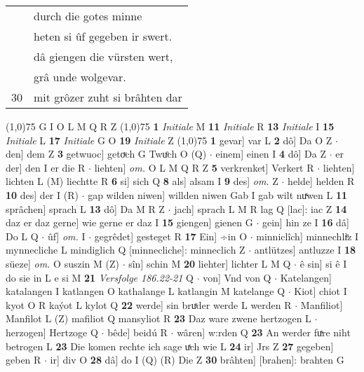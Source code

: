 \documentclass[8pt,a4paper,notitlepage]{article}
\begin{document}
\begin{table}[ht]
\begin{minipage}[t]{0.5\linewidth}
\begin{tabular}{rl}
 & durch die gotes minne\\ 
 & heten si ûf gegeben ir swert.\\ 
 & dâ giengen die vürsten wert,\\ 
 & grâ unde wolgevar.\\ 
30 & mit grôzer zuht si brâhten dar\\ 
\end{tabular}
\scriptsize
\line(1,0){75} \newline
G I O L M Q R Z \newline
\line(1,0){75} \newline
\textbf{1} \textit{Initiale} M  \textbf{11} \textit{Initiale} R  \textbf{13} \textit{Initiale} I  \textbf{15} \textit{Initiale} L  \textbf{17} \textit{Initiale} G O  \textbf{19} \textit{Initiale} Z  \newline
\line(1,0){75} \newline
\textbf{1} gevar] var L \textbf{2} dô] Da O Z  $\cdot$ den] dem Z \textbf{3} getwuoc] getoͮch G Twuͦch O (Q)  $\cdot$ einem] einen I \textbf{4} dô] Da Z  $\cdot$ er der] den I er die R  $\cdot$ liehten] \textit{om.} O L M Q R Z \textbf{5} verkrenket] Verkert R  $\cdot$ liehten] lichten L (M) liechtte R \textbf{6} si] sich Q \textbf{8} als] alsam I \textbf{9} des] \textit{om.} Z  $\cdot$ helde] helden R \textbf{10} des] der I (R)  $\cdot$ gap wilden niwen] willden niwen Gab I gab wilt nuͯwen L \textbf{11} sprâchen] sprach L \textbf{13} dô] Da M R Z  $\cdot$ jach] sprach L M R lag Q [lac]: iac Z \textbf{14} daz er daz gerne] wie gerne er daz I \textbf{15} giengen] gienen G  $\cdot$ gein] hin ze I \textbf{16} dâ] Do L Q  $\cdot$ ûf] \textit{om.} I  $\cdot$ gegrêdet] gesteget R \textbf{17} Ein] ÷in O  $\cdot$ minniclîch] minnechliͤz I mynnecliche L mindiglich Q [minnecliche]: minneclich Z  $\cdot$ antlützes] antluzze I \textbf{18} süeze] \textit{om.} O suszin M (Z)  $\cdot$ sîn] schin M \textbf{20} liehter] lichter L M Q  $\cdot$ ê sin] si ê I do sie in L e si M \textbf{21} \textit{Versfolge 186.22-21} Q   $\cdot$ von] Vnd von Q  $\cdot$ Katelangen] katalangen I katlangen O kathalange L katlangin M katelange Q  $\cdot$ Kiot] chiot I kyot O R kaýot L kylot Q \textbf{22} werde] sin bruͯder werde L werden R  $\cdot$ Manfiliot] Manfilot L (Z) mafiliot Q mansyliot R \textbf{23} Daz ware zwene hertzogen L  $\cdot$ herzogen] Hertzoge Q  $\cdot$ bêde] beidú R  $\cdot$ wâren] w:rden Q \textbf{23} An werder fuͯre niht betrogen L \textbf{23} Die komen rechte ich sage uͯch wie L \textbf{24} ir] Jrs Z \textbf{27} gegeben] geben R  $\cdot$ ir] div O \textbf{28} dâ] do I (Q) (R) Die Z \textbf{30} brâhten] [brahen]: brahten G \newline

\end{minipage}
\end{table}
\end{document}
